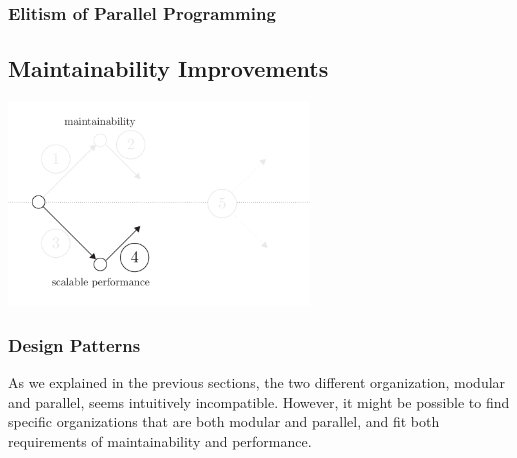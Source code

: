 



\subsubsection{Elitism of Parallel Programming}



\subsection{Maintainability Improvements}


\begin{center}
\includegraphics[width=0.6\textwidth]{../ressources/state-of-the-art-4.pdf}
\end{center}

\subsubsection{Design Patterns}

As we explained in the previous sections, the two different organization, modular and parallel, seems intuitively incompatible.
However, it might be possible to find specific organizations that are both modular and parallel, and fit both requirements of maintainability and performance.


